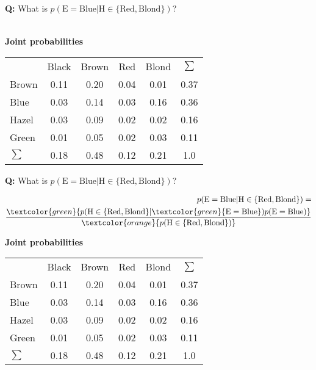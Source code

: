 \documentclass[usenames,dvipsnames,table]{beamer}
\newcommand{\cgy}{\cellcolor{gray!25}}
\newcommand{\cgr}{\cellcolor{green!25}}
\newcommand{\cye}{\cellcolor{orange!25}}
\begin{document}
\begin{frame}

\textbf{Q:} What is $p(\mathrm{E}=\mathrm{Blue}|\mathrm{H} \in \{\mathrm{Red}, \mathrm{Blond}\})$?

\begin{align}\end{align}

\textbf{Joint probabilities}
\begin{table}
\begin{tabular}{lccccc}
           & Black & Brown & Red  & Blond & $\sum$ \\
     Brown &  0.11 &  0.20 & 0.04 &  0.01 & 0.37  \\
      Blue &  0.03 &  0.14 & 0.03 &  0.16 & 0.36  \\
     Hazel &  0.03 &  0.09 & 0.02 &  0.02 & 0.16  \\
     Green &  0.01 &  0.05 & 0.02 &  0.03 & 0.11  \\
    $\sum$ &  0.18 &  0.48 & 0.12 &  0.21 & 1.0   \\
\end{tabular}
\end{table}
\end{frame}

\begin{frame}

\textbf{Q:} What is $p(\mathrm{E}=\mathrm{Blue}|\mathrm{H} \in \{\mathrm{Red}, \mathrm{Blond}\})$?

\begin{align*}
p(\mathrm{E}=\mathrm{Blue}|\mathrm{H}\in\{\mathrm{Red},\mathrm{Blond}\})
=\\ \frac{\textcolor{green}{p(\mathrm{H}\in\{\mathrm{Red},\mathrm{Blond}\}
                             |\textcolor{green}{\mathrm{E}=\mathrm{Blue}})
                             p(\mathrm{E}=\mathrm{Blue})}}
       {\textcolor{orange}{p(\mathrm{H}\in\{\mathrm{Red}, \mathrm{Blond}\})}}
\end{align*}

\textbf{Joint probabilities}
\begin{table}
\begin{tabular}{lccccc}
           & Black & Brown & Red  & Blond & $\sum$ \\
     Brown &\cgy0.11&\cgy0.20&\cye0.04&\cye0.01& 0.37 \\
      Blue &\cgy0.03&\cgy0.14&\cgr0.03&\cgr0.16& 0.36 \\
     Hazel &\cgy0.03&\cgy0.09&\cye0.02&\cye0.02& 0.16 \\
     Green &\cgy0.01&\cgy0.05&\cye0.02&\cye0.03& 0.11 \\
    $\sum$ &  0.18 &  0.48 & 0.12 &  0.21 & 1.0   \\
\end{tabular}
\end{table}
\end{frame}
\end{document}
